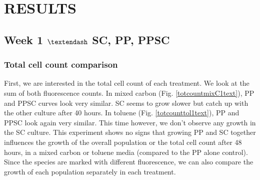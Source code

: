 \documentclass[a4paper, 10pt, conference]{ieeeconf}   %
\begin{document}
\section{RESULTS}
\subsection{Week 1 $\textendash$ SC, PP, PPSC}
\subsubsection{Total cell count comparison}


First, we are interested in the total cell count of each treatment. We look at the sum of both fluorescence counts.
In mixed carbon (Fig. \ref{totcountmixC1text}), PP and PPSC curves look very similar. SC seems to grow slower but catch up with the other culture after 40 hours.
In toluene (Fig. \ref{totcounttol1text}), PP and PPSC look again very similar. This time however, 
we don’t observe any growth in the SC culture.
This experiment shows no signs that growing PP and SC together influences the growth of the overall population or the total cell count after 48 hours, in a mixed carbon or toluene media (compared to the PP alone control).
Since the species are marked with different fluorescence, we can also compare the growth of each population separately in each treatment.\newline

%	
%	
%	
\end{document}
